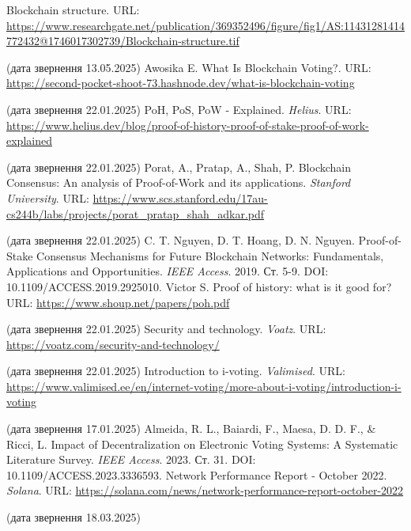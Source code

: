 \documentclass[14pt]{extreport}
\begin{document}
  \renewcommand\bibname{\MakeUppercase{Список літератури}}
  \begin{thebibliography}{99}
     Blockchain structure. URL: \url{https://www.researchgate.net/publication/369352496/figure/fig1/AS:11431281414772432@1746017302739/Blockchain-structure.tif}

    (дата звернення 13.05.2025)
     Awosika E. What Is Blockchain Voting?. URL: \url{https://second-pocket-shoot-73.hashnode.dev/what-is-blockchain-voting}

    (дата звернення 22.01.2025)
     PoH, PoS, PoW - Explained. \textit{Helius}. URL: \url{https://www.helius.dev/blog/proof-of-history-proof-of-stake-proof-of-work-explained}
    
    (дата звернення 22.01.2025)
     Porat, A., Pratap, A., Shah, P. Blockchain Consensus: An analysis of Proof-of-Work and its applications. \textit{Stanford University}. URL: \url{https://www.scs.stanford.edu/17au-cs244b/labs/projects/porat_pratap_shah_adkar.pdf}
    
    (дата звернення 22.01.2025)
     C. T. Nguyen, D. T. Hoang, D. N. Nguyen. Proof-of-Stake Consensus Mechanisms for Future Blockchain Networks: Fundamentals, Applications and Opportunities. \textit{IEEE Access}. 2019. Ст. 5-9. DOI: 10.1109/ACCESS.2019.2925010.
     Victor S. Proof of history: what is it good for? URL: \url{https://www.shoup.net/papers/poh.pdf}
    
    (дата звернення 22.01.2025)
     Security and technology. \textit{Voatz}. URL: \url{https://voatz.com/security-and-technology/}
    
    (дата звернення 22.01.2025)
     Introduction to i-voting. \textit{Valimised}. 
    URL: \url{https://www.valimised.ee/en/internet-voting/more-about-i-voting/introduction-i-voting}
    
    (дата звернення 17.01.2025)
     Almeida, R. L., Baiardi, F., Maesa, D. D. F., \& Ricci, L. Impact of Decentralization on Electronic Voting Systems: A Systematic Literature Survey. \textit{IEEE Access}. 2023. Ст. 31. DOI: 10.1109/ACCESS.2023.3336593.
     Network Performance Report - October 2022. \textit{Solana}. URL: \url{https://solana.com/news/network-performance-report-october-2022}
    
    (дата звернення 18.03.2025)
  \end{thebibliography}
  
\end{document}
